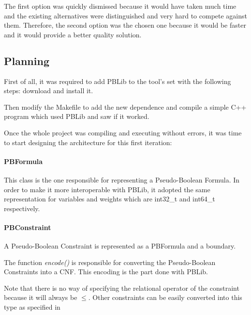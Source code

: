 The first option was quickly dismissed because it would have taken much time and the existing alternatives were distinguished and very hard to compete against them. Therefore, the second option was the chosen one because it would be faster and it would provide a better quality solution. 


\subsection{Planning}

First of all, it was required to add PBLib to the tool's set with the following steps: download and install it.  

Then modify the Makefile to add the new dependence and compile a simple C++ program which used PBLib and saw if it worked.  

Once the whole project was compiling and executing without errors, it was time to start designing the architecture for this first iteration: \\



\paragraph{PBFormula}

This class is the one responsible for representing a Pseudo-Boolean Formula. In order to make it more interoperable with PBLib, it adopted the same representation for variables and weights which are int32\_t and int64\_t respectively.  




\paragraph{PBConstraint} 

A Pseudo-Boolean Constraint is represented as a PBFormula and a boundary.  

The function \emph{encode()} is responsible for converting the Pseudo-Boolean Constraints into a CNF. This encoding is the part done with PBLib. 

Note that there is no way of specifying the relational operator of the constraint because it will always be $\leq$.  Other constraints can be easily converted into this type as specified in %

